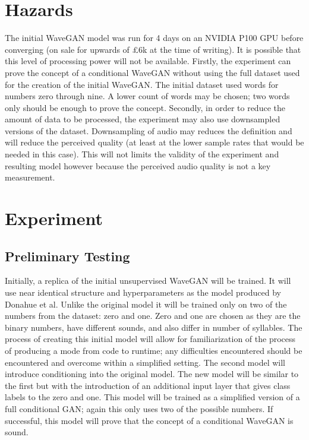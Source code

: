 \documentclass{article}
\begin{document}
\section{Hazards}

The initial WaveGAN model was run for 4 days on an NVIDIA P100 GPU before converging (on sale for upwards of £6k at the time of writing).
It is possible that this level of processing power will not be available.
\newline
\newline
Firstly, the experiment can prove the concept of a conditional WaveGAN without using the full dataset used for the creation of the initial WaveGAN.
The initial dataset used words for numbers zero through nine.
A lower count of words may be chosen; two words only should be enough to prove the concept.
\newline
\newline
Secondly, in order to reduce the amount of data to be processed, the experiment may also use downsampled versions of the dataset.
Downsampling of audio may reduces the definition and will reduce the perceived quality (at least at the lower sample rates that would be needed in this case).
This will not limits the validity of the experiment and resulting model however because the perceived audio quality is not a key measurement.

\section{Experiment}

\subsection{Preliminary Testing}

Initially, a replica of the initial unsupervised WaveGAN will be trained.
It will use near identical structure and hyperparameters as the model produced by Donahue et al.
Unlike the original model it will be trained only on two of the numbers from the dataset: zero and one.
Zero and one are chosen as they are the binary numbers, have different sounds, and also differ in number of syllables.
The process of creating this initial model will allow for familiarization of the process of producing a mode from code to runtime; any difficulties encountered should be encountered and overcome within a simplified setting. 
\newline
\newline
The second model will introduce conditioning into the original model.
The new model will be similar to the first but with the introduction of an additional input layer that gives class labels to the zero and one.
This model will be trained as a simplified version of a full conditional GAN; again this only uses two of the possible numbers.
If successful, this model will prove that the concept of a conditional WaveGAN is sound.
\end{document}
